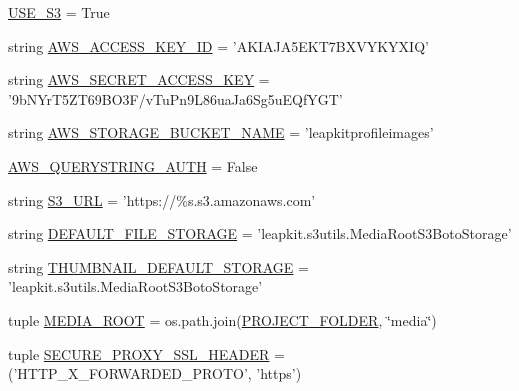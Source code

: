 \begin{DoxyCompactItemize}
\item 
\hyperlink{namespaceleapkit_1_1settings_1_1base__settings_a18af37dfa377da7c96033a5e3286a3e1}{U\-S\-E\-\_\-\-S3} = True
\item 
string \hyperlink{namespaceleapkit_1_1settings_1_1base__settings_abc881298226b69b8bbc706d906916feb}{A\-W\-S\-\_\-\-A\-C\-C\-E\-S\-S\-\_\-\-K\-E\-Y\-\_\-\-I\-D} = 'A\-K\-I\-A\-J\-A5\-E\-K\-T7\-B\-X\-V\-Y\-K\-Y\-X\-I\-Q'
\item 
string \hyperlink{namespaceleapkit_1_1settings_1_1base__settings_a8437c99d84e41ca21bb0c63c3e84bb56}{A\-W\-S\-\_\-\-S\-E\-C\-R\-E\-T\-\_\-\-A\-C\-C\-E\-S\-S\-\_\-\-K\-E\-Y} = '9b\-N\-Yr\-T5\-Z\-T69\-B\-O3\-F/v\-Tu\-Pn9\-L86ua\-Ja6\-Sg5u\-E\-Qf\-Y\-G\-T'
\item 
string \hyperlink{namespaceleapkit_1_1settings_1_1base__settings_ae34790283f98076aae6f90cc833ee25f}{A\-W\-S\-\_\-\-S\-T\-O\-R\-A\-G\-E\-\_\-\-B\-U\-C\-K\-E\-T\-\_\-\-N\-A\-M\-E} = 'leapkitprofileimages'
\item 
\hyperlink{namespaceleapkit_1_1settings_1_1base__settings_a777d26573652b45301de5f61a315fb4f}{A\-W\-S\-\_\-\-Q\-U\-E\-R\-Y\-S\-T\-R\-I\-N\-G\-\_\-\-A\-U\-T\-H} = False
\item 
string \hyperlink{namespaceleapkit_1_1settings_1_1base__settings_a28eb159fe53e214eb5fabc02d60e80af}{S3\-\_\-\-U\-R\-L} = 'https\-://\%s.\-s3.\-amazonaws.\-com'
\item 
string \hyperlink{namespaceleapkit_1_1settings_1_1base__settings_a5c55e294bced5c52f26c7ac022d8b90e}{D\-E\-F\-A\-U\-L\-T\-\_\-\-F\-I\-L\-E\-\_\-\-S\-T\-O\-R\-A\-G\-E} = 'leapkit.\-s3utils.\-Media\-Root\-S3\-Boto\-Storage'
\item 
string \hyperlink{namespaceleapkit_1_1settings_1_1base__settings_a2e36f272241c43edf18996e98f8b95ec}{T\-H\-U\-M\-B\-N\-A\-I\-L\-\_\-\-D\-E\-F\-A\-U\-L\-T\-\_\-\-S\-T\-O\-R\-A\-G\-E} = 'leapkit.\-s3utils.\-Media\-Root\-S3\-Boto\-Storage'
\item 
tuple \hyperlink{namespaceleapkit_1_1settings_1_1base__settings_af1098dc3ea39ef75a14788108fe09d8c}{M\-E\-D\-I\-A\-\_\-\-R\-O\-O\-T} = os.\-path.\-join(\hyperlink{namespaceleapkit_1_1settings_1_1base__settings_a608118bf02a6f09810f065178ee998a3}{P\-R\-O\-J\-E\-C\-T\-\_\-\-F\-O\-L\-D\-E\-R}, \char`\"{}media\char`\"{})
\item 
tuple \hyperlink{namespaceleapkit_1_1settings_1_1base__settings_abb1ad1a1506983f1210b79fa962d0cac}{S\-E\-C\-U\-R\-E\-\_\-\-P\-R\-O\-X\-Y\-\_\-\-S\-S\-L\-\_\-\-H\-E\-A\-D\-E\-R} = ('H\-T\-T\-P\-\_\-\-X\-\_\-\-F\-O\-R\-W\-A\-R\-D\-E\-D\-\_\-\-P\-R\-O\-T\-O', 'https')

\end{DoxyCompactItemize}
